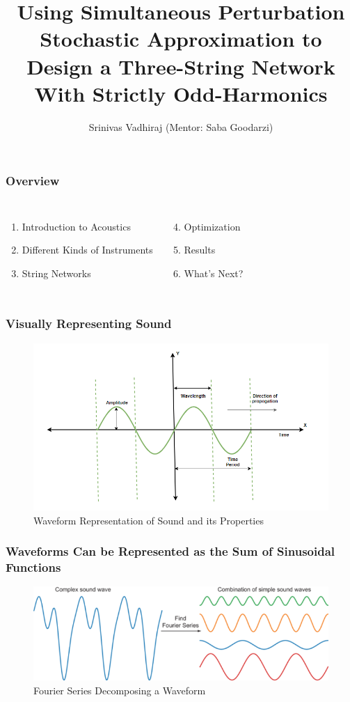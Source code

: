 \documentclass{beamer}
\title{Using Simultaneous Perturbation Stochastic Approximation to Design a Three-String Network With Strictly Odd-Harmonics}
\author{Srinivas Vadhiraj (Mentor: Saba Goodarzi)}
\begin{document}
\frame{\titlepage}
\begin{frame}
\frametitle{Overview}
\begin{columns}[t]
\begin{enumerate}
\item Introduction to Acoustics
\item Different Kinds of Instruments
\item String Networks
\end{enumerate}
\begin{enumerate}
\setcounter{enumi}{3}
\item Optimization
\item Results
\item What's Next?
\end{enumerate}
\end{columns}
\end{frame}

\begin{frame}
\frametitle{Visually Representing Sound}
    \centering
    \begin{figure}
    \includegraphics[width=\textwidth,height=.8\textheight,keepaspectratio]{diagram.png}
    \caption{Waveform Representation of Sound and its Properties}
    \end{figure}
\end{frame}


\begin{frame}
\frametitle{Waveforms Can be Represented as the Sum of Sinusoidal Functions}
    \centering
    \begin{figure}
    \includegraphics[width=\textwidth,height=.8\textheight,keepaspectratio]{decomposing_wave.png}
    \caption{Fourier Series Decomposing a Waveform}
    \end{figure}
\end{frame}
\end{document}
